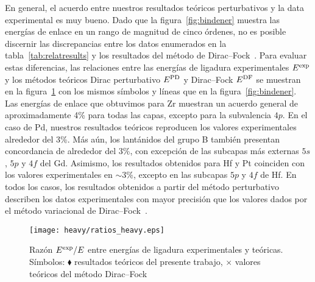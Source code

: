 En general, el acuerdo entre nuestros resultados teóricos perturbativos 
y la data experimental es muy bueno. Dado que la 
figura~\ref{fig:bindener} muestra las energías de enlace en un rango de 
magnitud de cinco órdenes, no es posible discernir las discrepancias 
entre los datos enumerados en la tabla~\ref{tab:relatresults} y los 
resultados del método de Dirac--Fock~\cite{Desclaux:73}. Para evaluar 
estas diferencias, las relaciones entre las energías de ligadura 
experimentales $E^{\mbox{\scriptsize exp}}$ y los métodos teóricos 
Dirac perturbativo $E^{\mbox{\scriptsize PD}}$ y Dirac--Fock
$E^{\mbox{\scriptsize DF}}$ se muestran en la figura~\ref{fig:ratios} 
con los mismos símbolos y líneas que en la figura~\ref{fig:bindener}. 
Las energías de enlace que obtuvimos para Zr muestran un acuerdo 
general de aproximadamente 4\% para todas las capas, excepto para la 
subvalencia $4p$. En el caso de Pd, nuestros resultados teóricos 
reproducen los valores experimentales alrededor del 3\%. Más aún, los 
lantánidos del grupo B también presentan concordancia de alrededor del 
3\%, con excepción de las subcapas más externas $5s$, $5p$ y $4f$ del 
Gd. Asimismo, los resultados obtenidos para Hf y Pt coinciden con los 
valores experimentales en $\sim$3\%, excepto en las subcapas $5p$ y 
$4f$ de Hf. En todos los casos, los resultados obtenidos a partir del 
método perturbativo describen los datos experimentales con mayor 
precisión que los valores dados por el método variacional de 
Dirac--Fock~\cite{Desclaux:73}.

\begin{figure}[t]
\centering
\texttt{[image: heavy/ratios\_heavy.eps]} 
\caption[Razón $E^{\mbox{\scriptsize exp}}/E$ 
entre energías de ligadura experimentales y teóricas.]
{Razón $E^{\mbox{\scriptsize exp}}/E$ 
entre energías de ligadura experimentales y teóricas. Símbolos: 
$\blacklozenge$ resultados teóricos del presente trabajo, 
$\times$ valores teóricos del método Dirac--Fock~\cite{Desclaux:73}}
\label{fig:ratios}
\end{figure}

\begin{comment}
\begin{figure}[t]
\centering
\texttt{[image: heavy/erp\_heavy.eps]} 
\caption{Errores relativos porcentuales correspondientes a los 
resultados teóricos.}
\label{fig:erpheavy}
\end{figure}
\end{comment}

